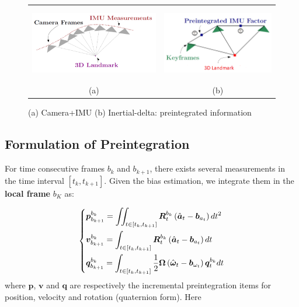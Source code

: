 \documentclass[12pt]{report}   %
\begin{document}
\begin{figure}[H]
	\begin{center}\begin{tabular}{cc}
			\includegraphics[height=3.3cm]{figures/IMU-sample_Image-frames_3D_illustration.png}&
			\includegraphics[height=3.3cm]{figures/Preintegrated-IMU_image_3D_illustration.png}\\
			(a) & (b) \\
	\end{tabular}\end{center}
	\caption{(a) Camera+IMU (b) Inertial-delta: preintegrated information \cite{Manifold2015}} 
	\label{fig:VIN sensor information}
\end{figure} 

\subsection{Formulation of Preintegration}\label{sec:preintegration}
For time consecutive frames $b_k$ and $b_{k+1}$, there exists several
measurements in the time interval $[t_k, t_{k+1}]$. Given the bias estimation,
we integrate them in the \textbf{local frame} $b_K$ as:

\begin{equation}
\centering
\left\{
\begin{aligned}
&\bm{p}_{b_{k+1}}^{b_k}=\iint_{t\in\left[t_k,t_{k+1}\right]}\bm{R}_{t}^{b_k}\left(\hat{\bm{a}}_{t}-\bm{b}_{a_t}\right)dt^2\\
&\bm{v}_{b_{k+1}}^{b_k}=\int_{t\in\left[t_k,t_{k+1}\right]}\bm{R}_{t}^{b_k}\left(\hat{\bm{a}}_{t}-\bm{b}_{a_t}\right)dt \\
&\bm{q}_{b_{k+1}}^{b_k}=\int_{t\in\left[t_k,t_{k+1}\right]}\frac{1}{2}\bm{\Omega}\left(\hat{\bm{\omega}}_t-\bm{b}_{\omega_t}\right)\bm{q}_t^{b_k}dt
\end{aligned}
\right.
\label{eq.preintegration}
\end{equation}
where $\bm{p}$, $\bm{v}$ and $\bm{q}$ are respectively the
incremental preintegration items for position, velocity and rotation (quaternion
form). Here 
\end{document}
